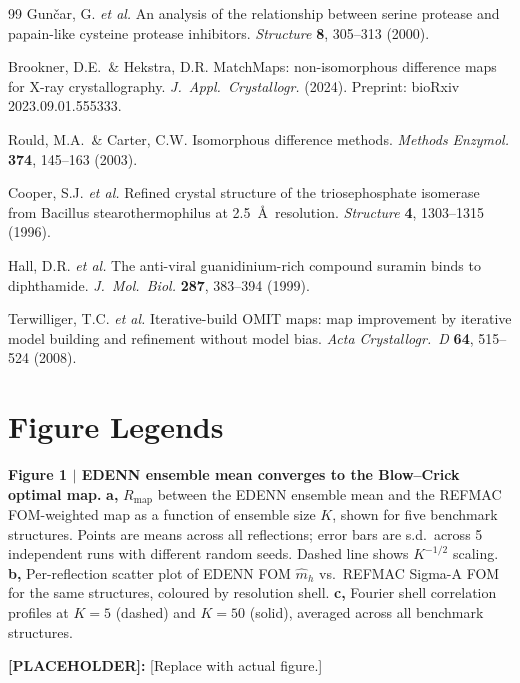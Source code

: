 \documentclass[10pt,twocolumn]{article}
\newcommand{\placeholder}[1]{%
  \begin{mdframed}[
    linecolor=placeholder,linewidth=1pt,
    backgroundcolor=red!5,
    innertopmargin=6pt,innerbottommargin=6pt,
    innerleftmargin=8pt,innerrightmargin=8pt]
  \small\color{placeholder}\textbf{[PLACEHOLDER]:} #1
  \end{mdframed}
}
\begin{document}
\begin{thebibliography}{99}
Gun\v{c}ar, G. \textit{et al.}
An analysis of the relationship between serine protease and
papain-like cysteine protease inhibitors.
\textit{Structure} \textbf{8}, 305--313 (2000).

Brookner, D.E.\ \& Hekstra, D.R.
MatchMaps: non-isomorphous difference maps for X-ray crystallography.
\textit{J.\ Appl.\ Crystallogr.} (2024).
Preprint: bioRxiv 2023.09.01.555333.

Rould, M.A.\ \& Carter, C.W.
Isomorphous difference methods.
\textit{Methods Enzymol.} \textbf{374}, 145--163 (2003).

Cooper, S.J. \textit{et al.}
Refined crystal structure of the triosephosphate isomerase from
Bacillus stearothermophilus at 2.5~\AA\ resolution.
\textit{Structure} \textbf{4}, 1303--1315 (1996).

Hall, D.R. \textit{et al.}
The anti-viral guanidinium-rich compound suramin binds to diphthamide.
\textit{J.\ Mol.\ Biol.} \textbf{287}, 383--394 (1999).

Terwilliger, T.C. \textit{et al.}
Iterative-build OMIT maps: map improvement by iterative model
building and refinement without model bias.
\textit{Acta Crystallogr.\ D} \textbf{64}, 515--524 (2008).

\end{thebibliography}

\onecolumn
\section*{Figure Legends}

\noindent\textbf{Figure 1 $|$ EDENN ensemble mean converges to the
Blow--Crick optimal map.}
\textbf{a,} $R_{\mathrm{map}}$ between the EDENN ensemble mean and
the REFMAC FOM-weighted map as a function of ensemble size $K$,
shown for five benchmark structures.
Points are means across all reflections; error bars are s.d.\
across 5 independent runs with different random seeds.
Dashed line shows $K^{-1/2}$ scaling.
\textbf{b,} Per-reflection scatter plot of EDENN FOM $\hat m_h$
vs.\ REFMAC Sigma-A FOM for the same structures, coloured by
resolution shell.
\textbf{c,} Fourier shell correlation profiles at $K=5$ (dashed)
and $K=50$ (solid), averaged across all benchmark structures.
\placeholder{[Replace with actual figure.]}
\end{document}
